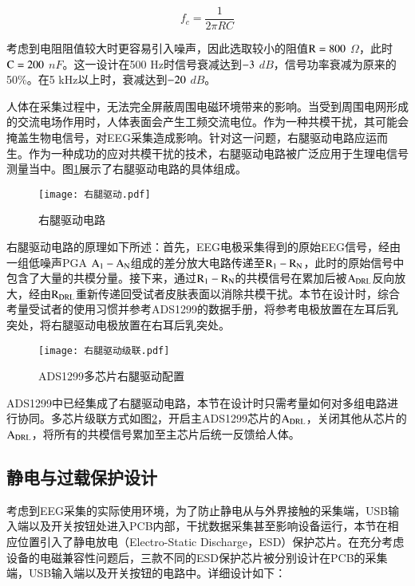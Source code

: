 \begin{equation}
    \label{deqn_ex2_2}
    f_c = \frac{1}{2\pi RC}
\end{equation}

考虑到电阻阻值较大时更容易引入噪声，因此选取较小的阻值$\rm R= 800$ $\Omega$，此时$\rm C = 200$ $nF$。这一设计在500 Hz时信号衰减达到$\rm -3$ $dB$，信号功率衰减为原来的50\%。在5 kHz以上时，衰减达到$\rm -20$ $dB$。


人体在采集过程中，无法完全屏蔽周围电磁环境带来的影响。当受到周围电网形成的交流电场作用时，人体表面会产生工频交流电位。作为一种共模干扰，其可能会掩盖生物电信号，对EEG采集造成影响。针对这一问题，右腿驱动电路应运而生。作为一种成功的应对共模干扰的技术，右腿驱动电路被广泛应用于生理电信号测量当中\cite{2-4}。图\ref{fig2-14}展示了右腿驱动电路的具体组成。

\begin{figure}[!h]
	\centering
	\texttt{[image: 右腿驱动.pdf]}
	\caption{右腿驱动电路} 
	\label{fig2-14}
\end{figure}

右腿驱动电路的原理如下所述：首先，EEG电极采集得到的原始EEG信号，经由一组低噪声PGA $\rm A_1-A_N$组成的差分放大电路传递至$\rm R_1-R_N$，此时的原始信号中包含了大量的共模分量。接下来，通过$\rm R_1-R_N$的共模信号在累加后被$\rm A_{DRL}$反向放大，经由$\rm R_{DRL}$重新传递回受试者皮肤表面以消除共模干扰。本节在设计时，综合考量受试者的使用习惯并参考ADS1299的数据手册，将参考电极放置在左耳后乳突处，将右腿驱动电极放置在右耳后乳突处。

\begin{figure}[h!]
	\centering
	\texttt{[image: 右腿驱动级联.pdf]}
	\caption{ADS1299多芯片右腿驱动配置} 
	\label{fig2-15}
\end{figure}

ADS1299中已经集成了右腿驱动电路，本节在设计时只需考量如何对多组电路进行协同。多芯片级联方式如图\ref{fig2-15}，开启主ADS1299芯片的$\rm A_{DRL}$，关闭其他从芯片的$\rm A_{DRL}$，将所有的共模信号累加至主芯片后统一反馈给人体。

\subsection{静电与过载保护设计}
考虑到EEG采集的实际使用环境，为了防止静电从与外界接触的采集端，USB输入端以及开关按钮处进入PCB内部，干扰数据采集甚至影响设备运行，本节在相应位置引入了静电放电（Electro-Static Discharge，ESD）保护芯片。在充分考虑设备的电磁兼容性问题后，三款不同的ESD保护芯片被分别设计在PCB的采集端，USB输入端以及开关按钮的电路中。详细设计如下：

